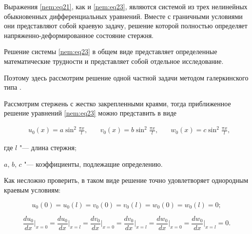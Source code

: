 Выражения \eqref{nem:eq21}, как и \eqref{nem:eq23}, являются системой из трех нелинейных обыкновенных дифференциальных уравнений. Вместе с граничными условиями они представляют собой краевую задачу, решение которой полностью определяет напряженно-деформированное состояние стержня.



\smallskip




Решение системы \eqref{nem:eq23} в общем виде представляет определенные математические трудности и представляет собой отдельное исследование. 

Поэтому здесь рассмотрим решение одной частной задачи методом галеркинского типа \cite{Fletcher}.



Рассмотрим стержень с жестко закрепленными краями, тогда приближенное решение уравнений \eqref{nem:eq23} можно представить в виде

\begin{equation}\label{nem:eq24}

\begin{aligned}

&u_0(x)=a\sin^2 \frac{\pi x}{l},\quad 

&v_0(x)=b\sin^2 \frac{\pi x}{l},\quad 

&w_0(x)=c\sin^2 \frac{\pi x}{l},

\end{aligned}

\end{equation}

где $l$ "---  длина стержня; 

$a$, $b$, $c$ "---  коэффициенты, подлежащие определению.

Как несложно проверить, в таком виде решение точно удовлетворяет однородным краевым условиям: 

$$

u_0(0)=u_0 (l)=v_0(0)=v_0(l)=w_0(0)=w_0(l)=0;$$   

$$

\frac{du_0}{dx}\Bigr|_{x=0}=\frac{du_0}{dx}\Bigr|_{x=l}=

\frac{dv_0}{dx}\Bigr|_{x=0}=\frac{dv_0}{dx}\Bigr|_{x=l}=

\frac{dw_0}{dx}\Bigr|_{x=0}=\frac{dw_0}{dx}\Bigr|_{x=l}=0.

$$



